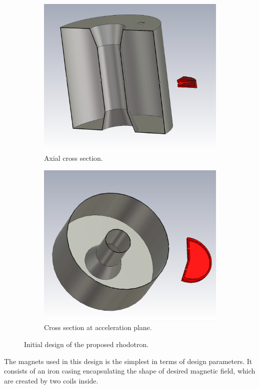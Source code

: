 \documentclass[a4paper,oneside,12pt]{report}
\numberwithin{equation}{chapter}
\begin{document}
\begin{figure}[H]
    \captionsetup[subfigure]{justification=centering}
    \captionsetup{justification=centering}
    \centering
    \begin{subfigure}{.5\textwidth}
      \centering
      \includegraphics[width=.92\linewidth]{./figures/cst/cst_first_design3.png}
      \caption{Axial cross section.}
    \end{subfigure}%
    \centering
    \begin{subfigure}{.5\textwidth}
      \centering
      \includegraphics[width=.9\linewidth]{./figures/cst/cst_first_design2.png}
      \caption{Cross section at acceleration plane.}
    \end{subfigure}
    \caption{Initial design of the proposed rhodotron.}
    \label{fig:initial_design_cross_section}
\end{figure}
The magnets used in this design is the simplest in terms of design parameters. It consists of an iron casing encapsulating the shape of desired magnetic field, which are created by two coils inside.
\end{document}
